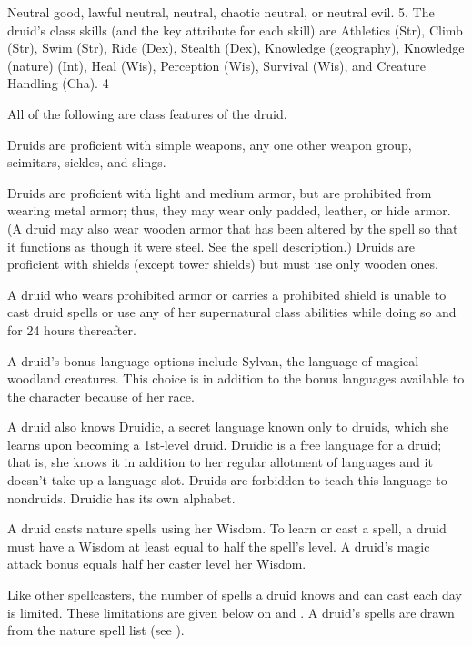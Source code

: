  Neutral good, lawful neutral, neutral, chaotic
neutral, or neutral evil.
 5.
The druid's class skills (and the key attribute for each skill) are Athletics (Str), Climb (Str), Swim (Str), Ride (Dex), Stealth (Dex), Knowledge (geography), Knowledge (nature) (Int), Heal (Wis), Perception (Wis), Survival (Wis), and Creature Handling (Cha).
 4

All of the following are class features of the druid.

 Druids are proficient with simple weapons, any one other weapon group, scimitars, sickles, and slings.
\par Druids are proficient with light and medium armor, but are prohibited from wearing metal armor; thus, they may wear only padded, leather, or hide armor. (A druid may also wear wooden armor that has been altered by the  spell so that it functions as though it were steel. See the  spell description.) Druids are proficient with shields (except tower shields) but must use only wooden ones.
\par A druid who wears prohibited armor or carries a prohibited shield is unable to cast druid spells or use any of her supernatural class abilities while doing so and for 24 hours thereafter.

 A druid's bonus language options include Sylvan, the language of magical woodland creatures. This choice is in addition to the bonus languages available to the character because of her race.

A druid also knows Druidic, a secret language known only to druids, which she learns upon becoming a 1st-level druid. Druidic is a free language for a druid; that is, she knows it in addition to her regular allotment of languages and it doesn't take up a language slot. Druids are forbidden to teach this language to nondruids. Druidic has its own alphabet.

 A druid casts nature spells using her Wisdom. To learn or cast a spell, a druid must have a Wisdom at least equal to half the spell's level. A druid's magic attack bonus equals half her caster level \add her Wisdom.

Like other spellcasters, the number of spells a druid knows and can cast each day is limited. These limitations are given below on  and . A druid's spells are drawn from the nature spell list (see ).

